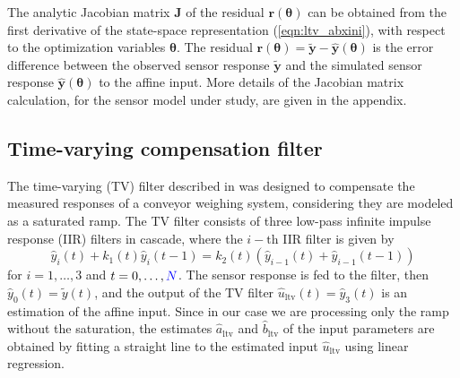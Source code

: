 The analytic Jacobian matrix $\mathbf{J}$ of the residual $\mathbf{r}(\bm{\theta})$ can be obtained from the first derivative of the state-space representation (\ref{eqn:ltv_abxini}), with respect to the optimization variables $\bm{\theta}$. 
The residual $\mathbf{r}(\bm{\theta}) = \widetilde{\mathbf{y}} - \widehat{\mathbf{y}}(\bm{\theta})$ is the error difference between the observed sensor response $\widetilde{\mathbf{y}}$ and the simulated sensor response $\widehat{\mathbf{y}}(\bm{\theta})$ to the affine input. 
More details of the Jacobian matrix calculation, for the sensor model under study, are given in the appendix.


\subsection{Time-varying compensation filter}

The time-varying (TV) filter described in \citet{Pietrzak14} was designed to compensate the measured responses of a conveyor weighing system, considering they are modeled as a saturated ramp.
The TV filter consists of three low-pass infinite impulse response (IIR) filters in cascade, where the $i-\mathrm{th}$ IIR filter is given by
\begin{equation} \widehat{y}_i(t) + k_1(t) \widehat{y}_i(t-1) = k_2(t) \left( \widehat{y}_{i-1}(t) + \widehat{y}_{i-1}(t-1) \right) \end{equation}
for $i = 1,\ldots,3$ and $t=0, \ldots, \color{blue}N\color{black}$.
The sensor response is fed to the filter, then $\widehat{y}_0(t) = \widetilde{y}(t)$, and the output of the TV filter $\widehat{u}_\mathrm{ltv}(t) = \widehat{y}_3(t)$ is an estimation of the affine input.
Since in our case we are processing only the ramp without the saturation, the estimates $\widehat{a}_\mathrm{ltv}$ and $\widehat{b}_\mathrm{ltv}$ of the input parameters are obtained by fitting a straight line to the estimated input $\widehat{u}_\mathrm{ltv}$ using linear regression.

